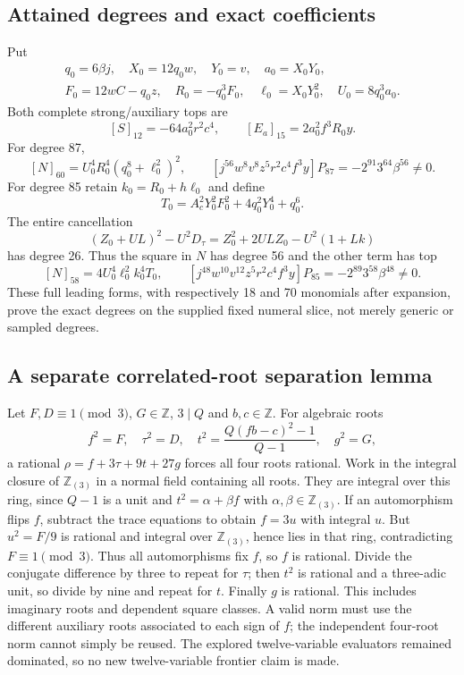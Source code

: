\subsection{Attained degrees and exact coefficients}
Put
\[
\begin{gathered}
 q_0=6\beta j,\quad X_0=12q_0w,\quad Y_0=v,\quad a_0=X_0Y_0,\\
 F_0=12wC-q_0z,\quad R_0=-q_0^3F_0,\quad \ell_0=X_0Y_0^2,\quad U_0=8q_0^3a_0.
\end{gathered}
\]
Both complete strong/auxiliary tops are
\[
 [S]_{12}=-64a_0^2r^2c^4,\qquad [E_a]_{15}=2a_0^2f^3R_0y.
\]
For degree 87,
\[
 [N]_{60}=U_0^4R_0^4(q_0^8+\ell_0^2)^2,
\qquad
 [j^{56}w^8v^8z^5r^2c^4f^3y]P_{87}=-2^{91}3^{64}\beta^{56}\ne0.
\]
For degree 85 retain $k_0=R_0+h\ell_0$ and define
\[
 T_0=A_c^2Y_0^2F_0^2+4q_0^2Y_0^4+q_0^6.
\]
The entire cancellation
\[
 (Z_0+UL)^2-U^2D_\tau=Z_0^2+2ULZ_0-U^2(1+Lk)
\]
has degree 26. Thus the square in $N$ has degree 56 and the other term has top
\[
 [N]_{58}=4U_0^4\ell_0^2k_0^4T_0,
\qquad
 [j^{48}w^{10}v^{12}z^5r^2c^4f^3y]P_{85}=-2^{89}3^{58}\beta^{48}\ne0.
\]
These full leading forms, with respectively 18 and 70 monomials after expansion,
prove the exact degrees on the supplied fixed numeral slice, not merely generic
or sampled degrees.

\subsection{A separate correlated-root separation lemma}
Let $F,D\equiv1\pmod3$, $G\in\mathbb Z$, $3\mid Q$ and $b,c\in\mathbb Z$.
For algebraic roots
\[
 f^2=F,\quad\tau^2=D,\quad
 t^2=\frac{Q(fb-c)^2-1}{Q-1},\quad g^2=G,
\]
a rational $\rho=f+3\tau+9t+27g$ forces all four roots rational.
Work in the integral closure of $\mathbb Z_{(3)}$ in a normal field containing
all roots. They are integral over this ring, since $Q-1$ is a unit and
$t^2=\alpha+\beta f$ with $\alpha,\beta\in\mathbb Z_{(3)}$.
If an automorphism flips $f$, subtract the trace equations to obtain $f=3u$
with integral $u$. But $u^2=F/9$ is rational and integral over $\mathbb Z_{(3)}$,
hence lies in that ring, contradicting $F\equiv1\pmod3$. Thus all automorphisms
fix $f$, so $f$ is rational. Divide the conjugate difference by three to repeat
for $\tau$; then $t^2$ is rational and a three-adic unit, so divide by nine and
repeat for $t$. Finally $g$ is rational. This includes imaginary roots and
dependent square classes. A valid norm must use the different auxiliary roots
associated to each sign of $f$; the independent four-root norm cannot simply be
reused. The explored twelve-variable evaluators remained dominated, so no new
twelve-variable frontier claim is made.

